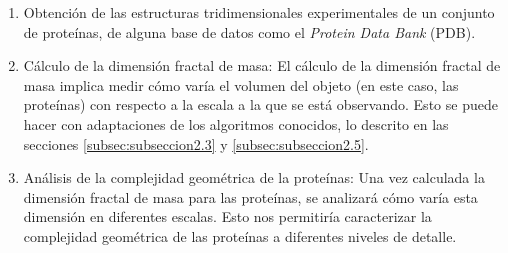 \documentclass[11pt]{article}
\begin{document}
\begin{enumerate}
	
\item Obtenci\'{o}n de las estructuras tridimensionales experimentales de un conjunto de prote\'{i}nas, de alguna base de datos como el \textit{Protein Data Bank} (PDB).

\item C\'{a}lculo de la dimensi\'{o}n fractal de masa: El c\'{a}lculo de la dimensi\'{o}n fractal de masa implica medir c\'{o}mo var\'{i}a el volumen del objeto (en este caso, las prote\'{i}nas) con respecto a la escala a la que se est\'{a} observando. Esto se puede hacer con adaptaciones de los algoritmos conocidos, lo descrito en las secciones \ref{subsec:subseccion2.3} y \ref{subsec:subseccion2.5}.

\item An\'{a}lisis de la complejidad geom\'{e}trica de la prote\'{i}nas: Una vez calculada la dimensi\'{o}n fractal de masa para las prote\'{i}nas, se analizar\'{a} c\'{o}mo var\'{i}a esta dimensi\'{o}n en diferentes escalas. Esto nos permitir\'{i}a caracterizar la complejidad geom\'{e}trica de las prote\'{i}nas a diferentes niveles de detalle.

\end{enumerate}

\clearpage
\end{document}
